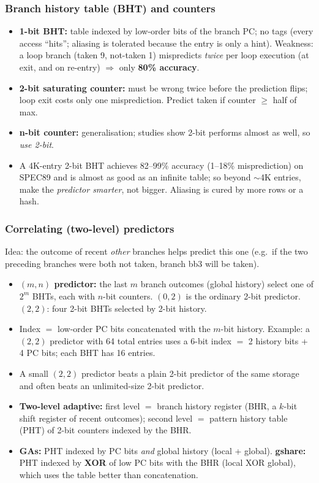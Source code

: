 \subsubsection{Branch history table (BHT) and counters}
\begin{itemize}
\item \textbf{1-bit BHT:} table indexed by low-order bits of the branch PC; no tags (every access ``hits''; aliasing is tolerated because the entry is only a hint). Weakness: a loop branch (taken 9, not-taken 1) mispredicts \emph{twice} per loop execution (at exit, and on re-entry) $\Rightarrow$ only \textbf{80\% accuracy}.
\item \textbf{2-bit saturating counter:} must be wrong twice before the prediction flips; loop exit costs only one misprediction. Predict taken if counter $\ge$ half of max.
\item \textbf{n-bit counter:} generalisation; studies show 2-bit performs almost as well, so \emph{use 2-bit}.
\item A 4K-entry 2-bit BHT achieves 82--99\% accuracy (1--18\% misprediction) on SPEC89 and is almost as good as an infinite table; so beyond $\sim$4K entries, make the \emph{predictor smarter}, not bigger. Aliasing is cured by more rows or a hash.
\end{itemize}

\subsubsection{Correlating (two-level) predictors}
Idea: the outcome of recent \emph{other} branches helps predict this one (e.g.\ if the two preceding branches were both not taken, branch bb3 will be taken).
\begin{itemize}
\item \textbf{$(m,n)$ predictor:} the last $m$ branch outcomes (global history) select one of $2^m$ BHTs, each with $n$-bit counters. $(0,2)$ is the ordinary 2-bit predictor. $(2,2)$: four 2-bit BHTs selected by 2-bit history.
\item Index $=$ low-order PC bits concatenated with the $m$-bit history. Example: a $(2,2)$ predictor with 64 total entries uses a 6-bit index $=$ 2 history bits + 4 PC bits; each BHT has 16 entries.
\item A small $(2,2)$ predictor beats a plain 2-bit predictor of the same storage and often beats an unlimited-size 2-bit predictor.
\item \textbf{Two-level adaptive:} first level $=$ branch history register (BHR, a $k$-bit shift register of recent outcomes); second level $=$ pattern history table (PHT) of 2-bit counters indexed by the BHR.
\item \textbf{GAs:} PHT indexed by PC bits \emph{and} global history (local + global). \textbf{gshare:} PHT indexed by \textbf{XOR} of low PC bits with the BHR (local XOR global), which uses the table better than concatenation\bs.
\end{itemize}

